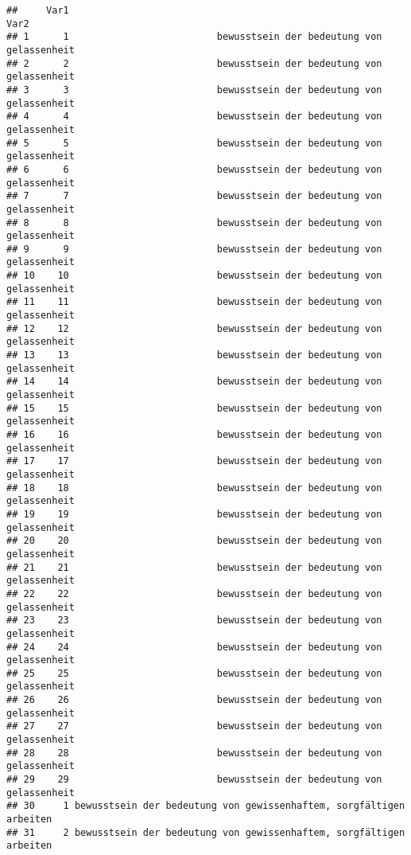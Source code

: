 \documentclass[
]{article}
\begin{document}
\begin{verbatim}
##     Var1                                                                Var2
## 1      1                          bewusstsein der bedeutung von gelassenheit
## 2      2                          bewusstsein der bedeutung von gelassenheit
## 3      3                          bewusstsein der bedeutung von gelassenheit
## 4      4                          bewusstsein der bedeutung von gelassenheit
## 5      5                          bewusstsein der bedeutung von gelassenheit
## 6      6                          bewusstsein der bedeutung von gelassenheit
## 7      7                          bewusstsein der bedeutung von gelassenheit
## 8      8                          bewusstsein der bedeutung von gelassenheit
## 9      9                          bewusstsein der bedeutung von gelassenheit
## 10    10                          bewusstsein der bedeutung von gelassenheit
## 11    11                          bewusstsein der bedeutung von gelassenheit
## 12    12                          bewusstsein der bedeutung von gelassenheit
## 13    13                          bewusstsein der bedeutung von gelassenheit
## 14    14                          bewusstsein der bedeutung von gelassenheit
## 15    15                          bewusstsein der bedeutung von gelassenheit
## 16    16                          bewusstsein der bedeutung von gelassenheit
## 17    17                          bewusstsein der bedeutung von gelassenheit
## 18    18                          bewusstsein der bedeutung von gelassenheit
## 19    19                          bewusstsein der bedeutung von gelassenheit
## 20    20                          bewusstsein der bedeutung von gelassenheit
## 21    21                          bewusstsein der bedeutung von gelassenheit
## 22    22                          bewusstsein der bedeutung von gelassenheit
## 23    23                          bewusstsein der bedeutung von gelassenheit
## 24    24                          bewusstsein der bedeutung von gelassenheit
## 25    25                          bewusstsein der bedeutung von gelassenheit
## 26    26                          bewusstsein der bedeutung von gelassenheit
## 27    27                          bewusstsein der bedeutung von gelassenheit
## 28    28                          bewusstsein der bedeutung von gelassenheit
## 29    29                          bewusstsein der bedeutung von gelassenheit
## 30     1 bewusstsein der bedeutung von gewissenhaftem, sorgfältigen arbeiten
## 31     2 bewusstsein der bedeutung von gewissenhaftem, sorgfältigen arbeiten

\end{verbatim}
\end{document}
